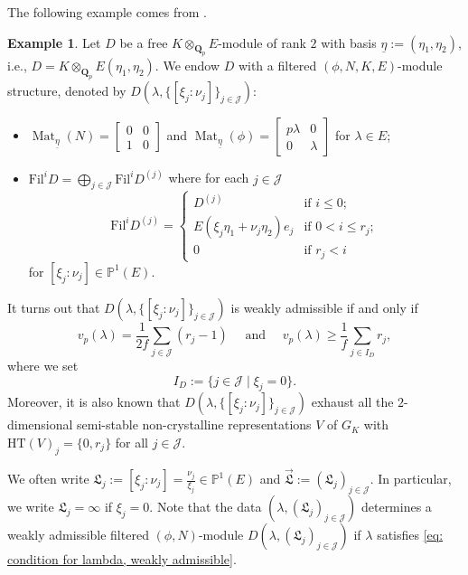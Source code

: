 \documentclass[11pt]{amsart}
\theoremstyle{definition}
\numberwithin{equation}{subsection}
\theoremstyle{plain}
\theoremstyle{plain}
\theoremstyle{plain}
\theoremstyle{plain}
\theoremstyle{plain}
\theoremstyle{plain}
\theoremstyle{plain}
\theoremstyle{plain}
\theoremstyle{plain}
\theoremstyle{plain}
\theoremstyle{plain}
\theoremstyle{plain}
\theoremstyle{definition}
\theoremstyle{definition}
\theoremstyle{definition}
\newtheorem{exam}[equation]{Example}
\theoremstyle{remark}
\renewcommand{\(}{\textup{(}}
\renewcommand{\)}{\textup{)}}
\DeclareMathOperator{\Mat}{Mat}
\newcommand{\Q}{\mathbf{Q}}
\newcommand{\fL}{\mathfrak{L}}
\newcommand{\Fil}{\mathrm{Fil}}
\newcommand{\cJ}{\mathcal{J}}
\newcommand{\vL}{\vec{\fL}}
\begin{document}
The following example comes from \cite{Dous}.
\begin{exam}\label{exam: admissible filtered modules}
Let $D$ be a free $K\otimes_{\Q_p}E$-module of rank $2$ with basis $\underline{\eta}:=(\eta_1,\eta_2)$, i.e., $D=K\otimes_{\Q_p}E(\eta_1,\eta_2)$. We endow $D$ with a filtered $(\phi,N,K,E)$-module structure, denoted by $D(\lambda,\{[\xi_j:\nu_j]\}_{j\in\cJ})$:
\begin{itemize}[leftmargin=*]
\item $\Mat_{\underline{\eta}}(N)=
\begin{bmatrix}
0 &0\\
1 & 0
\end{bmatrix}$ and
$\Mat_{\underline{\eta}}(\phi)=
\begin{bmatrix}
p\lambda &0\\
0 & \lambda
\end{bmatrix}$ for $\lambda\in E$;
\item $\Fil^iD=\bigoplus_{j\in\cJ}\Fil^iD^{(j)}$ where for each $j\in\cJ$
$$\Fil^iD^{(j)}=
\begin{cases}
D^{(j)} & \mbox{if }i\leq 0;\\
E(\xi_j\eta_1+\nu_j\eta_2)e_j & \mbox{if }0<i\leq r_j;\\
0 & \mbox{if }r_j<i
\end{cases}
$$
for $[\xi_j:\nu_j]\in\mathbb{P}^1(E)$.
\end{itemize}
It turns out that $D(\lambda,\{[\xi_j:\nu_j]\}_{j\in\cJ})$ is weakly admissible if and only if
\begin{equation}\label{eq: condition for lambda, weakly admissible}
v_p(\lambda)=\frac{1}{2f}\sum_{j\in\cJ}(r_j-1)\quad\mbox{ and }\quad v_p(\lambda)\geq\frac{1}{f}\sum_{j\in I_D}r_j,
\end{equation}
where we set $$I_D:=\{j\in\cJ\mid\xi_j=0\}.$$ Moreover, it is also known that $D(\lambda,\{[\xi_j:\nu_j]\}_{j\in\cJ})$ exhaust all the $2$-dimensional semi-stable non-crystalline representations $V$ of $G_{K}$ with $\mathrm{HT}(V)_j=\{0,r_j\}$ for all $j\in\cJ$.


We often write $\fL_j:=[\xi_j:\nu_j]=\frac{\nu_j}{\xi_j}\in\mathbb{P}^1(E)$ and $\vL:=(\fL_j)_{j\in\cJ}$. In particular, we write $\fL_j=\infty$ if $\xi_j=0$. Note that the data $\left(\lambda,(\fL_j)_{j\in\cJ}\right)$ determines a weakly admissible filtered $(\phi,N)$-module $D(\lambda,(\fL_j)_{j\in\cJ})$ if $\lambda$ satisfies \eqref{eq: condition for lambda, weakly admissible}.
\end{exam}
\end{document}
